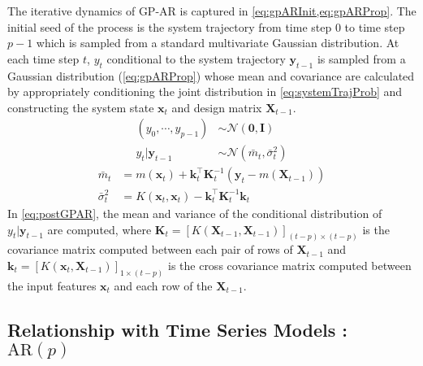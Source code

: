 The iterative dynamics of GP-AR is captured in \cref{eq:gpARInit,eq:gpARProp}. The initial seed of the process is the 
system trajectory from time step $0$ to time step $p-1$ which is sampled from a standard multivariate Gaussian distribution. At each time step $t$, $y_t$ conditional to the system trajectory $\mathbf{y}_{t-1}$ is sampled 
from a Gaussian distribution (\cref{eq:gpARProp}) whose mean and covariance are calculated by appropriately 
conditioning the joint distribution in \cref{eq:systemTrajProb} and constructing the system state 
$\mathbf{x}_t$ and design matrix $\mathbf{X}_{t-1}$.     
%
\begin{align}
    (y_0, \cdots, y_{p-1}) &\sim \mathcal{N}(\mathbf{0}, \mathbf{I}) \label{eq:gpARInit}\\
    y_t \rvert \mathbf{y}_{t-1} &\sim \mathcal{N}(\bar{m}_t, \bar{\sigma}_{t}^2) \label{eq:gpARProp}
\end{align}
%
\begin{equation}\label{eq:postGPAR}
    \begin{aligned}
        \bar{m}_t &= m(\mathbf{x}_t) + 
        \mathbf{k}_{t}^{\intercal}\mathbf{K}_{t}^{-1}\left( \mathbf{y}_t - m(\mathbf{X}_{t-1}) \right) \\
        \bar{\sigma}^{2}_{t} &= K(\mathbf{x}_t, \mathbf{x}_t) - 
        \mathbf{k}_{t}^{\intercal} \mathbf{K}_{t}^{-1} \mathbf{k}_{t}
    \end{aligned}
\end{equation}
%
In \cref{eq:postGPAR}, the mean and variance of the conditional distribution of $y_t \rvert \mathbf{y}_{t-1}$ are 
computed, where $\mathbf{K}_{t} = [K(\mathbf{X}_{t-1}, \mathbf{X}_{t-1})]_{(t-p) \times (t-p)}$ is the 
covariance matrix computed between each pair of rows of $\mathbf{X}_{t-1}$ and 
$\mathbf{k}_{t} = [K(\mathbf{x}_t, \mathbf{X}_{t-1})]_{1 \times (t-p)}$ is the cross covariance matrix computed 
between the input features $\mathbf{x}_t$ and each row of the $\mathbf{X}_{t-1}$.

\subsection*{Relationship with Time Series Models : $\mathrm{AR}(p)$}

